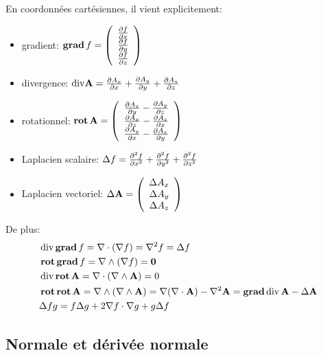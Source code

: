 \medskip
En coordonnées cartésiennes, il vient explicitement:
\begin{itemize}
   \item gradient: $ \operatorname{\mathbf{grad}}  f=
	\left( \begin{array}{c} {\partial f \over \partial x}\\ {\partial f \over \partial y}\\ {\partial f \over \partial z}
	\end{array}\right)$
   \item divergence: $ \mathrm{div} \mathbf{A}  =
	{\partial A_x \over \partial x} + {\partial A_y \over \partial y} + {\partial A_z \over \partial z}$
   \item rotationnel: $ \operatorname{\mathbf{rot}}  {\mathbf{A} } =
	\left( \begin{array}{c} {\partial A_z \over \partial y} - {\partial A_y \over \partial z} \\
	{\partial A_x \over \partial z} - {\partial A_z \over \partial x} \\
	{\partial A_y \over \partial x} - {\partial A_x \over \partial y}
	\end{array}\right)$
   \item Laplacien scalaire: $\Delta f  ={\partial^2 f \over \partial x^2} + {\partial^2 f \over \partial y^2} + {\partial^2 f \over \partial z^2}$
   \item Laplacien vectoriel: $\Delta \mathbf{A}  =
	\left( \begin{array}{c} \Delta A_x \\ \Delta A_y \\ \Delta A_z
	\end{array}\right)$
\end{itemize}

\medskip
De plus:
\begin{align}
&\dive \gradb f = \nabla \cdot (\nabla f) = \nabla^2 f = \Delta f\\
&\rotb\gradb f = \nabla \wedge ( \nabla f)
\colorred = \boldsymbol 0\\
&\dive\rotb \mathbf{A}  = \nabla \cdot ( \nabla \wedge \mathbf{A} ) \colorred = 0\\
&\rotb\rotb\mathbf{A}  = \nabla \wedge (\nabla \wedge \mathbf{A} ) =\nabla ( \nabla \cdot \mathbf{A} ) - \nabla^2 \mathbf{A}  = \gradb\dive \mathbf{A}  - \Delta \mathbf{A} \\
&\Delta f g = f \Delta g + 2 \nabla f \cdot \nabla g + g \Delta f
\end{align}

\medskip
\subsection{Normale et dérivée normale}

